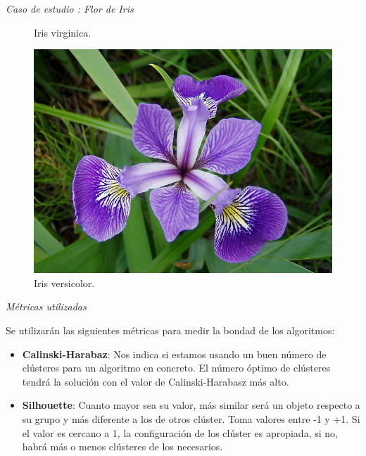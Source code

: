 \documentclass[spanish]{beamer}
\begin{document}
\begin{frame}{\textit{Caso de estudio : Flor de Iris}}
\begin{figure}[h]
\begin{minipage}[h]{0.28\textwidth}
    \caption{Iris virginica.}
  \end{minipage}
  \hfill
  \begin{minipage}[h]{0.29\textwidth}
    \includegraphics[width=\textwidth]{dani/versicolor.jpg}
    \caption{Iris versicolor.}
  \end{minipage}
\end{figure}
\end{frame}

\begin{frame}{\textit{Métricas utilizadas}}

Se utilizarán las siguientes métricas para medir la bondad de los algoritmos:\break
\begin{itemize}
\item \textbf{Calinski-Harabaz}: Nos indica si estamos usando un buen número de clústeres para un algoritmo en concreto. El número óptimo de clústeres tendrá la solución con el valor de Calinski-Harabasz más alto.
\item \textbf{Silhouette}: Cuanto mayor sea su valor, más similar será un objeto respecto a su grupo y más diferente a los de otros clúster. Toma valores entre -1 y +1. Si el valor es cercano a 1, la configuración de los clúster es apropiada, si no, habrá más o menos clústeres de los necesarios.
\end{itemize}
\end{frame}
\end{document}
